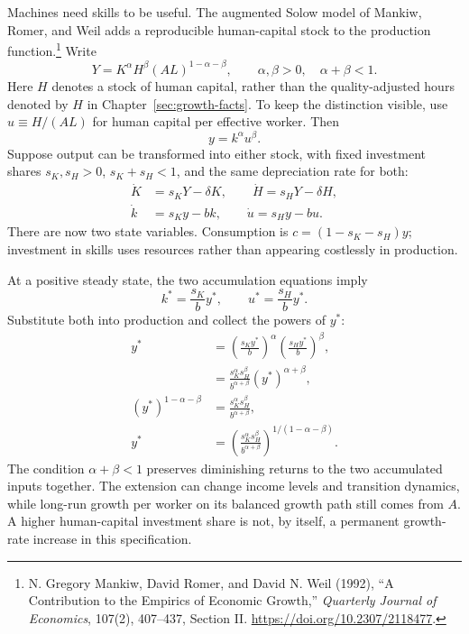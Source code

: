 Machines need skills to be useful. The augmented Solow model of Mankiw,
Romer, and Weil adds a reproducible human-capital stock to the production
function.\footnote{N. Gregory Mankiw, David Romer, and David N. Weil (1992),
``A Contribution to the Empirics of Economic Growth,'' \textit{Quarterly Journal
of Economics}, 107(2), 407--437, Section II.
\url{https://doi.org/10.2307/2118477}.}
Write
\begin{equation}
Y=K^\alpha H^\beta(AL)^{1-\alpha-\beta},\qquad
\alpha,\beta>0,\quad \alpha+\beta<1.
\end{equation}
Here $H$ denotes a stock of human capital, rather than the quality-adjusted
hours denoted by $H$ in Chapter~\ref{sec:growth-facts}. To keep the distinction
visible, use $u\equiv H/(AL)$ for human capital per effective worker. Then
\begin{equation}
y=k^\alpha u^\beta.
\end{equation}
Suppose output can be transformed into either stock, with fixed investment
shares $s_K,s_H>0$, $s_K+s_H<1$, and the same depreciation rate for both:
\begin{align}
\dot K&=s_KY-\delta K,\qquad
\dot H=s_HY-\delta H,\\
\dot k&=s_Ky-bk,\qquad
\dot u=s_Hy-bu.\label{eq:solow-human-dynamics}
\end{align}
There are now two state variables. Consumption is
$c=(1-s_K-s_H)y$; investment in skills uses resources rather than appearing
costlessly in production.

At a positive steady state, the two accumulation equations imply
\begin{equation}
k^*=\frac{s_K}{b}y^*,\qquad u^*=\frac{s_H}{b}y^*.
\end{equation}
Substitute both into production and collect the powers of $y^*$:
\begin{align}
y^*&=\left(\frac{s_Ky^*}{b}\right)^\alpha
       \left(\frac{s_Hy^*}{b}\right)^\beta,\\
 &=\frac{s_K^\alpha s_H^\beta}{b^{\alpha+\beta}}
        (y^*)^{\alpha+\beta},\\
(y^*)^{1-\alpha-\beta}
&=\frac{s_K^\alpha s_H^\beta}{b^{\alpha+\beta}},\\
y^*&=\left(\frac{s_K^\alpha s_H^\beta}
 {b^{\alpha+\beta}}\right)^{1/(1-\alpha-\beta)}.
\end{align}
The condition $\alpha+\beta<1$ preserves diminishing returns to the two
accumulated inputs together. The extension can change income levels and
transition dynamics, while long-run growth per worker on its balanced growth
path still comes from $A$. A higher human-capital investment share is not, by
itself, a permanent growth-rate increase in this specification.

